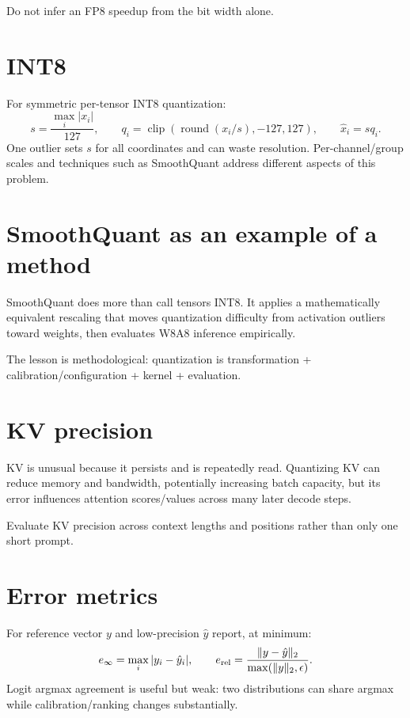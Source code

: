 Do not infer an FP8 speedup from the bit width alone.

\section{INT8}
For symmetric per-tensor INT8 quantization:
\[
s=\frac{\max_i|x_i|}{127},\qquad
q_i=\operatorname{clip}(\operatorname{round}(x_i/s),-127,127),\qquad
\hat x_i=sq_i.
\]
One outlier sets $s$ for all coordinates and can waste resolution. Per-channel/group scales and techniques such as SmoothQuant address different aspects of this problem.

\section{SmoothQuant as an example of a method}
SmoothQuant does more than call tensors INT8. It applies a mathematically equivalent rescaling that moves quantization difficulty from activation outliers toward weights, then evaluates W8A8 inference empirically.

The lesson is methodological: quantization is transformation + calibration/configuration + kernel + evaluation.

\section{KV precision}
KV is unusual because it persists and is repeatedly read. Quantizing KV can reduce memory and bandwidth, potentially increasing batch capacity, but its error influences attention scores/values across many later decode steps.

Evaluate KV precision across context lengths and positions rather than only one short prompt.

\section{Error metrics}
For reference vector $y$ and low-precision $\hat y$ report, at minimum:
\[
e_\infty=\max_i|y_i-\hat y_i|,
\qquad
e_{\rm rel}=\frac{\|y-\hat y\|_2}{\max(\|y\|_2,\epsilon)}.
\]
Logit argmax agreement is useful but weak: two distributions can share argmax while calibration/ranking changes substantially.

